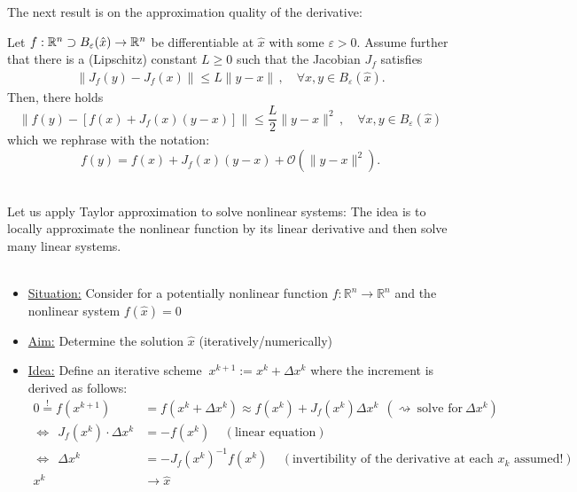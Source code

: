  
 

\begin{frame}
The next result is on the approximation quality of the derivative:
\begin{lemma}\label{taylor}
Let $f:{\mathbb{R}}^n\supset B_\varepsilon(\hat{x})\to{\mathbb{R}}^n$ be differentiable at $\hat{x}$ with some $\varepsilon>0$. Assume further that there is a (Lipschitz) constant $L \geq 0$ such that the Jacobian  $J_f$
satisfies
\begin{align}
\|J_f(y)-J_f(x)\|\le L\|y-x\|\, ,\quad\forall x,y\in B_\varepsilon(\hat{x}). \label{lipschitz}
\end{align}
Then, there holds
$$
\|f(y)-\left[f(x)+J_f(x)(y-x)\right]\|\le \frac{L}{2}\|y-x\|^2\, ,\quad\forall x,y\in B_\varepsilon(\hat{x})
$$
which we rephrase with the notation:
$$
f(y)=f(x)+J_f(x)(y-x) + \mathcal{O}(\|y-x\|^2).
$$
\end{lemma}
~\\
Let us apply Taylor approximation to solve nonlinear systems: The idea is to locally approximate the nonlinear function by its linear derivative and then solve many linear systems.\\ ~\\
\begin{itemize}
	\item \underline{Situation:} Consider for a potentially nonlinear function $f:\mathbb{R}^n\rightarrow\mathbb{R}^n$ and the nonlinear system $f(\hat{x})=0$\\
\item \underline{Aim:} Determine the solution $\hat{x}$ (iteratively/numerically)\\
\item \underline{Idea:} Define an iterative scheme $~x^{k+1}:=x^k+\Delta x^k$ where the increment is derived as follows:
\begin{align*}
0\stackrel{!}{=}f(x^{k+1})&=f(x^k+\Delta x^k)\approx f(x^k)+J_f(x^k)\Delta x^k~~(\rightsquigarrow~\text{solve for}~\Delta x^k)\\
\Leftrightarrow~~J_f(x^k)\cdot \Delta x^k&=-f(x^k)~~~~~(\text{linear equation})\\
\Leftrightarrow~~\Delta x^k&=-J_f(x^k)^{-1}f(x^k)~~~~~(\text{invertibility of the derivative at each $x_k$ assumed!})\\
x^k&\rightarrow\hat{x}
\end{align*}
\end{itemize}
\end{frame}


